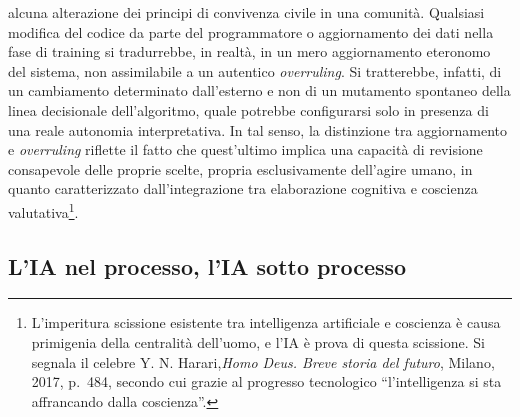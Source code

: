 \documentclass[american,a4paper,]{article}
\begin{document}
alcuna alterazione dei principi di convivenza civile in una comunità. Qualsiasi modifica del codice da parte del programmatore o aggiornamento dei dati nella fase di training si tradurrebbe, in realtà, in un mero aggiornamento eteronomo del sistema, non assimilabile a un autentico \emph{overruling}. Si tratterebbe, infatti, di un cambiamento determinato dall'esterno e non di un mutamento spontaneo della linea decisionale dell'algoritmo, quale potrebbe configurarsi solo in presenza di una reale autonomia interpretativa. In tal senso, la distinzione tra aggiornamento e \emph{overruling} riflette il fatto che quest'ultimo implica una capacità di revisione consapevole delle proprie scelte, propria esclusivamente dell'agire umano, in quanto caratterizzato dall'integrazione tra elaborazione cognitiva e coscienza valutativa\footnote{L'imperitura scissione esistente tra intelligenza artificiale e coscienza è causa primigenia della centralità dell'uomo, e l'IA è prova di questa scissione. Si segnala il celebre Y. N. Harari,\emph{Homo Deus. Breve storia del futuro}, Milano, 2017, p.~484, secondo cui grazie al progresso tecnologico ``l'intelligenza si sta affrancando dalla coscienza''.}.

\subsection{L'IA nel processo, l'IA sotto processo}\label{lia-nel-processo-lia-sotto-processo}
\end{document}

